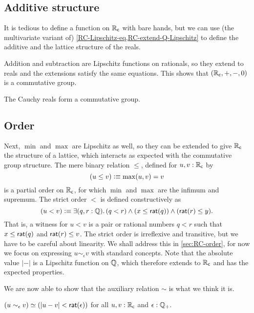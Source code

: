\subsection{Additive structure}
\label{sec:additive-structure-order}

It is tedious to define a function on $\mathbb{R}_\mathsf{c}$ with bare hands, but we can use (the
multivariate variant of) \autoref{RC-Lipschitz-eq,RC-extend-Q-Lipschitz} to define the
additive and the lattice structure of the reals.

Addition and subtraction are Lipschitz functions on rationals, so they extend to reals and
the extensions satisfy the same equations. This shows that $(\mathbb{R}_\mathsf{c}, {+}, {-}, 0)$ is a
commutative group.

\begin{thm} \label{RC-commutative-group}
  The Cauchy reals form a commutative group.
\end{thm}

\subsection{Order}
\label{sec:order}

Next, $\min$ and $\max$ are Lipschitz as well, so they can be extended to give $\mathbb{R}_\mathsf{c}$ the
structure of a lattice, which interacts as expected with the commutative group structure.
The mere binary relation $\leq$, defined for $u, v : \mathbb{R}_\mathsf{c}$ by
%
\begin{equation*}
  (u \leq v) \vcentcolon\equiv \max(u,v) = v
\end{equation*}
%
is a partial order on $\mathbb{R}_\mathsf{c}$, for which $\min$ and $\max$ are the infimum and supremum. The
strict order $<$ is defined constructively as
%
\begin{equation*}
  (u < v) \defeq
  \exis{q, r : \Q} (q < r) \land (x \leq \rcrat(q)) \land (\rcrat(r) \leq y).
\end{equation*}
%
That is, a witness for $u < v$ is a pair or rational numbers $q < r$ such that $x \leq
\mathsf{rat}(q)$ and $\mathsf{rat}(r) \leq v$. The strict order is irreflexive and transitive, but we
have to be careful about linearity. We shall address this in \autoref{sec:RC-order}, for
now we focus on expressing $u \sim_\epsilon v$ with standard concepts. Note that the
absolute value $|{-}|$ is a Lipschitz function on $\mathbb{Q}$, which therefore extends to $\mathbb{R}_\mathsf{c}$
and has the expected properties.

We are now able to show that the auxiliary relation $\sim$ is what we think it is.

\begin{thm} \label{RC-sim-eqv-le}
  $(u \sim_\epsilon v) \simeq (|u - v| < \mathsf{rat}(\epsilon))$
  for all $u, v : \mathbb{R}_\mathsf{c}$ and $\epsilon : \mathbb{Q}_{+}$.
\end{thm}

